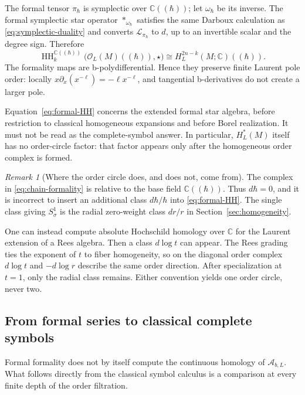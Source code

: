 \documentclass[11pt,oneside,reqno]{article}
\DeclareMathOperator{\HH}{HH}
\newcommand{\C}{\mathbb C}
\newcommand{\cA}{\mathcal A}
\theoremstyle{plain}
\theoremstyle{definition}
\theoremstyle{remark}
\newtheorem{remark}[theorem]{Remark}
\begin{document}
The formal tensor \(\pi_\hbar\) is symplectic over \(\C((\hbar))\); let
\(\omega_\hbar\) be its inverse.  The formal symplectic star operator
\(*_{\omega_\hbar}\) satisfies the same Darboux calculation as
\eqref{eq:symplectic-duality} and converts
\(\mathcal L_{\pi_\hbar}\) to \(d\), up to an invertible scalar and the
degree sign.  Therefore
\begin{equation}\label{eq:formal-HH}
 \HH_k^{\mathbb C((\hbar))}
 \bigl(\mathcal O_L(M)((\hbar)),\star\bigr)
 \cong H_L^{2n-k}(M;\C)((\hbar)).
\end{equation}
The formality maps are b-polydifferential.  Hence they preserve finite
Laurent pole order: locally \(x\partial_x(x^{-\ell})=-\ell x^{-\ell}\), and
tangential b-derivatives do not create a larger pole.

Equation~\eqref{eq:formal-HH} concerns the extended formal star algebra,
before restriction to classical homogeneous expansions and before Borel
realization.  It must not be read as the complete-symbol answer.  In
particular, \(H_L^*(M)\) itself has no order-circle factor: that factor
appears only after the homogeneous order complex is formed.

\begin{remark}[Where the order circle does, and does not, come from]
The complex in \eqref{eq:chain-formality} is relative to the base field
\(\C((\hbar))\).  Thus \(d\hbar=0\), and it is incorrect to insert an
additional class \(d\hbar/\hbar\) into \eqref{eq:formal-HH}.  The single
class giving \(S^1_\sigma\) is the radial zero-weight class \(dr/r\) in
Section~\ref{sec:homogeneity}.

One can instead compute absolute Hochschild homology over \(\C\) for the
Laurent extension of a Rees algebra.  Then a class \(d\log t\) can appear.
The Rees grading ties the exponent of \(t\) to fiber homogeneity, so on the
diagonal order complex \(d\log t\) and \(-d\log r\) describe the same order
direction.  After specialization at \(t=1\), only the radial class remains.
Either convention yields one order circle, never two.
\end{remark}

\subsection{From formal series to classical complete symbols}

Formal formality does not by itself compute the continuous homology of
\(\cA_{b,L}\).  What follows directly from the classical symbol calculus is
a comparison at every finite depth of the order filtration.
\end{document}
